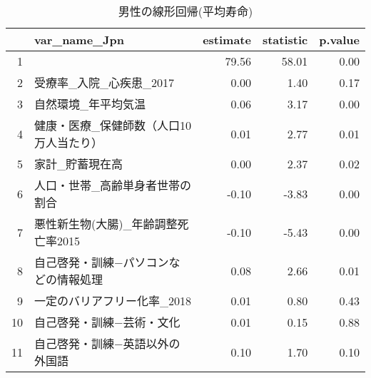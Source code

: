 \begin{table}[ht]
\centering
\caption{男性の線形回帰(平均寿命)} 
\label{UsualLMLEm}
\begingroup\tiny
\begin{tabular}{rlrrr}
  \hline
 & var\_name\_Jpn & estimate & statistic & p.value \\ 
  \hline
1 &  & 79.56 & 58.01 & 0.00 \\ 
  2 & 受療率\_入院\_心疾患\_2017 & 0.00 & 1.40 & 0.17 \\ 
  3 & 自然環境\_年平均気温 & 0.06 & 3.17 & 0.00 \\ 
  4 & 健康・医療\_保健師数（人口10万人当たり） & 0.01 & 2.77 & 0.01 \\ 
  5 & 家計\_貯蓄現在高 & 0.00 & 2.37 & 0.02 \\ 
  6 & 人口・世帯\_高齢単身者世帯の割合 & -0.10 & -3.83 & 0.00 \\ 
  7 & 悪性新生物(大腸)\_年齢調整死亡率2015 & -0.10 & -5.43 & 0.00 \\ 
  8 & 自己啓発・訓練−パソコンなどの情報処理 & 0.08 & 2.66 & 0.01 \\ 
  9 & 一定のバリアフリー化率\_2018 & 0.01 & 0.80 & 0.43 \\ 
  10 & 自己啓発・訓練−芸術・文化 & 0.01 & 0.15 & 0.88 \\ 
  11 & 自己啓発・訓練−英語以外の外国語 & 0.10 & 1.70 & 0.10 \\ 
   \hline
\end{tabular}
\endgroup
\end{table}
